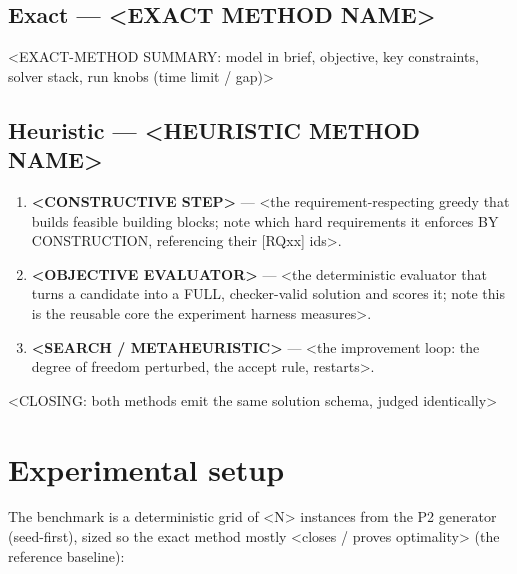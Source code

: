 \subsection{Exact --- <EXACT METHOD NAME>}
<EXACT-METHOD SUMMARY: model in brief, objective, key constraints, solver stack,
run knobs (time limit / gap)>

\subsection{Heuristic --- <HEURISTIC METHOD NAME>}
\begin{enumerate}
  \item \textbf{<CONSTRUCTIVE STEP>} --- <the requirement-respecting greedy that
        builds feasible building blocks; note which hard requirements it enforces
        BY CONSTRUCTION, referencing their [RQxx] ids>.
  \item \textbf{<OBJECTIVE EVALUATOR>} --- <the deterministic evaluator that turns
        a candidate into a FULL, checker-valid solution and scores it; note this
        is the reusable core the experiment harness measures>.
  \item \textbf{<SEARCH / METAHEURISTIC>} --- <the improvement loop: the degree of
        freedom perturbed, the accept rule, restarts>.
\end{enumerate}

<CLOSING: both methods emit the same solution schema, judged identically>

\section{Experimental setup}

The benchmark is a deterministic grid of <N> instances from the P2 generator
(seed-first), sized so the exact method mostly <closes / proves optimality>
(the reference baseline):

